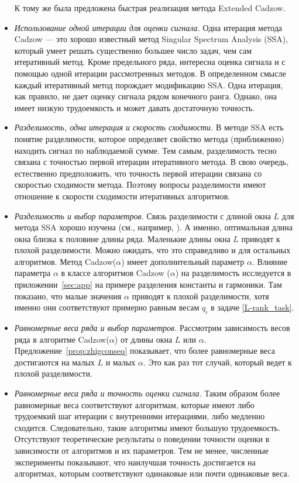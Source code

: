 \documentclass[12pt, specialist, subf,href,colorlinks=true,substylefile = spbu.rtx]{disser}
\theoremstyle{remark}
\theoremstyle{definition}
\begin{document}
\begin{itemize}
	К тому же была предложена быстрая реализация метода Extended Cadzow.
	\item \textit{Использование одной итерации для оценки сигнала.}
	Одна итерация метода Cadzow --- это хорошо известный метод Singular Spectrum Analysis (SSA), который умеет решать существенно большее число задач, чем сам итеративный метод. Кроме предельного ряда, интересна оценка сигнала и с помощью одной итерации рассмотренных методов. В определенном смысле каждый итеративный метод порождает модификацию SSA. Одна итерация, как правило, не дает оценку сигнала рядом конечного ранга. Однако, она имеет низкую трудоемкость и может давать достаточную точность.
	\item \textit{Разделимость, одна итерация и скорость сходимости.}
	В методе SSA есть понятие разделимости, которое определяет свойство метода (приближенно) находить сигнал по наблюдаемой сумме. Тем самым, разделимость
	тесно связана с точностью первой итерации итеративного метода. В свою очередь, естественно предположить, что точность первой итерации связана со скоростью сходимости метода. Поэтому вопросы разделимости имеют отношение к скорости сходимости итеративных алгоритмов.
	\item \textit{Разделимость и выбор параметров.}
	Связь разделимости с длиной окна $L$ для метода SSA хорошо изучена (см., например, \cite{Golyandina2010}). А именно, оптимальная длина окна близка
	к половине длины ряда. Маленькие длины окна $L$ приводят к плохой разделимости. Можно ожидать, что это справедливо и для остальных алгоритмов. Метод Cadzow($\alpha$) имеет дополнительный параметр $\alpha$. Влияние параметра $\alpha$ в классе алгоритмов
	Cadzow ($\alpha$) на разделимость исследуется в приложении~\ref{sec:app} на примере разделения константы и гармоники. Там показано, что малые значения
	$\alpha$ приводят к плохой разделимости, хотя именно они соответствуют примерно равным весам $q_i$ в задаче \eqref{L-rank_task}.
	\item \textit{Равномерные веса ряда и выбор параметров.}
	Рассмотрим зависимость весов ряда в алгоритме Cadzow($\alpha$) от длины окна $L$ или $\alpha$. Предложение~\ref{prop:zhigconseq} показывает, что более равномерные веса достигаются на малых $L$ и малых $\alpha$. Это как раз тот случай, который ведет к плохой разделимости.
	\item \textit{Равномерные веса ряда и точность оценки сигнала.}
	Таким образом более равномерные веса соответствуют алгоритмам, которые имеют либо трудоемкий шаг итерации с внутренними итерациями, либо медленно сходится. Следовательно, такие алгоритмы имеют большую трудоемкость. Отсутствуют теоретические результаты о поведении точности оценки в зависимости от алгоритмов и их параметров. Тем не менее, численные эксперименты показывают, что наилучшая точность достигается на алгоритмах, которым соответствуют одинаковые или почти одинаковые веса.
    \end{itemize}
	
\end{document}
